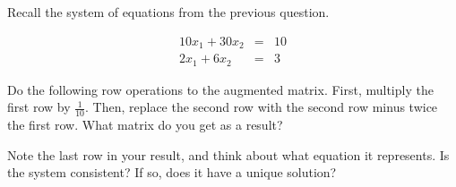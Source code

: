 \endedxproblem





\endedxvertical











Recall the system of equations from the previous question.  



\begin{eqnarray*}
10x_1 + 30x_2 & = & 10 \\
2x_1 + 6x_2 & = & 3 
\end{eqnarray*}





Do the following row operations to the augmented matrix.  First, multiply the first row by 
$\frac{1}{10}$.   Then, replace the second row with the second
row minus twice the first row.  What matrix do you get as a result?  





\endedxproblem




Note the last row in your result, and think about what equation it represents.  
Is the system consistent?  If so, does it have a unique solution?  



